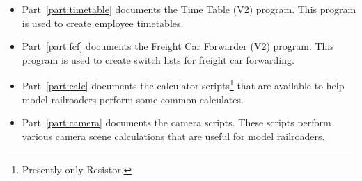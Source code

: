 \begin{itemize}
\item Part~\ref{part:timetable} documents the Time Table (V2) program.
This program is used to create employee timetables.
\item Part~\ref{part:fcf} documents the Freight Car Forwarder (V2)
program. This program is used to create switch lists for freight car
forwarding.
\item Part~\ref{part:calc} documents the calculator
scripts\footnote{Presently only Resistor.} that are available to help
model railroaders perform some common calculates.
\item Part~\ref{part:camera} documents the camera scripts.  These
scripts perform various camera scene calculations that are useful for
model railroaders.
\end{itemize}

